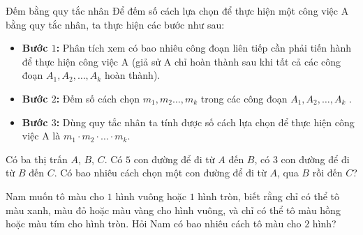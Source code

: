 \begin{dang}{Đếm bằng quy tắc nhân}
	Để đếm số cách lựa chọn để thực hiện một công việc A bằng quy tắc nhân, ta thực hiện các bước như sau:
	\begin{itemize}
		\item \textbf{Bước $1$:}	Phân tích xem có bao nhiêu công đoạn liên tiếp cần phải tiến hành để thực hiện công việc A (giả sử A chỉ hoàn thành sau khi tất cả các công đoạn $A_1,A_2,\ldots,A_k$  hoàn thành).
\item \textbf{Bước $2$:} Đếm số cách chọn $m_1,m_2\ldots,m_k$ trong các công đoạn $A_1,A_2,\ldots,A_k$ .
\item \textbf{Bước $3$:} Dùng quy tắc nhân ta tính được số cách lựa chọn để thực hiện công việc A là $m_1\cdot m_2\cdot\ldots \cdot m_k$.
\end{itemize}
\end{dang}
\begin{vd}%
	Có ba thị trấn $A$, $B$, $C$.  Có $5$ con đường để đi từ $A$ đến $B$, có $3$ con đường  để đi từ $B$ đến $C$. Có bao nhiêu cách chọn một con đường để đi từ $A$, qua $B$ rồi đến $C$?
\end{vd}	
\begin{vd}%
	Nam muốn tô màu cho $1$ hình vuông hoặc $1$ hình tròn, biết rằng chỉ có thể tô màu xanh, màu đỏ hoặc màu vàng cho hình vuông, và chỉ có thể tô màu hồng hoặc màu tím cho hình tròn. Hỏi Nam có bao nhiêu cách tô màu cho $2$ hình?
\end{vd}

